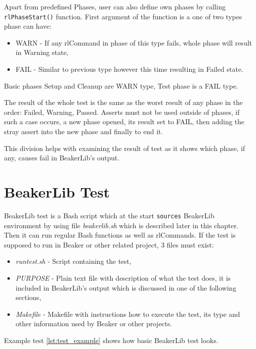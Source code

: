 Apart from predefined Phases, user can also define own phases by calling \texttt{rlPhaseStart()} function. First argument of the function is a one of two types phase can have:

\begin{itemize}
\item WARN - If any rlCommand in phase of this type fails, whole phase will result in Warning state,
\item FAIL - Similar to previous type however this time resulting in Failed state.
\end{itemize}

Basic phases Setup and Cleanup are WARN type, Test phase is a FAIL type.

The result of the whole test is the same as the worst result of any phase in the order: Failed, Warning, Passed.
Asserts must not be used outside of phases, if such a case occurs, a new phase opened, its result set to FAIL, then adding the stray assert into the new phase and finally to end it. 

This division helps with examining the result of test as it shows which phase, if any, causes fail in BeakerLib's output. 


\section{BeakerLib Test}
BeakerLib test is a Bash script which at the start \texttt{sources} BeakerLib environment by using file \textit{beakerlib.sh} which is described later in this chapter. Then it can run regular Bash functions as well as rlCommands. If the test is supposed to run in Beaker or other related project, 3 files must exist:
\begin{itemize}
\item \textit{runtest.sh} - Script containing the test,
\item \textit{PURPOSE} - Plain text file with description of what the test does, it is included in BeakerLib's output which is discussed in one of the following sections,
\item \textit{Makefile} - Makefile with instructions how to execute the test, its type and other information used by Beaker or other projects.
\end{itemize}

Example test \ref{lst:test_example} shows how basic BeakerLib test looks.

